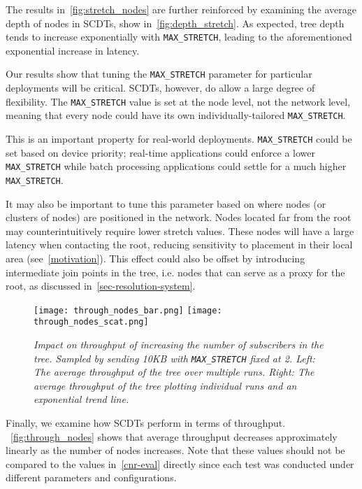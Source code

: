 The results in~\autoref{fig:stretch_nodes} are further reinforced by examining the average depth of nodes in SCDTs, show in~\autoref{fig:depth_stretch}. As expected, tree depth tends to increase exponentially with \texttt{MAX\_STRETCH}, leading to the aforementioned exponential increase in latency.

Our results show that tuning the \texttt{MAX\_STRETCH} parameter for particular deployments will be critical. SCDTs, however, do allow a large degree of flexibility. The \texttt{MAX\_STRETCH} value is set at the node level, not the network level, meaning that every node could have its own individually-tailored \texttt{MAX\_STRETCH}.

This is an important property for real-world deployments. \texttt{MAX\_STRETCH} could be set based on device priority; real-time applications could enforce a lower \texttt{MAX\_STRETCH} while batch processing applications could settle for a much higher \texttt{MAX\_STRETCH}.  

It may also be important to tune this parameter based on where nodes (or clusters of nodes) are positioned in the network. Nodes located far from the root may counterintuitively require lower stretch values. These nodes will have a large latency when contacting the root, reducing sensitivity to placement in their local area (see~\autoref{motivation}). This effect could also be offset by introducing intermediate join points in the tree, i.e. nodes that can serve as a proxy for the root, as discussed in~\autoref{sec-resolution-system}.
	
\begin{figure}[h]
	\begin{center}
		\texttt{[image: through\_nodes\_bar.png]}
		\texttt{[image: through\_nodes\_scat.png]}
	\end{center}
	\vspace{-1.3em}
	\caption{\small \itshape Impact on throughput of increasing the number of subscribers in the tree. Sampled by sending 10KB with \texttt{MAX\_STRETCH} fixed at 2. Left: The average throughput of the tree over multiple runs. Right: The average throughput of the tree plotting individual runs and an exponential trend line.}
	\vspace{-1em}
	\label{fig:through_nodes}
\end{figure}

Finally, we examine how SCDTs perform in terms of throughput. ~\autoref{fig:through_nodes} shows that average throughput decreases approximately linearly as the number of nodes increases. Note that these values should not be compared to the values in~\autoref{cnr-eval} directly since each test was conducted under different parameters and configurations.  

